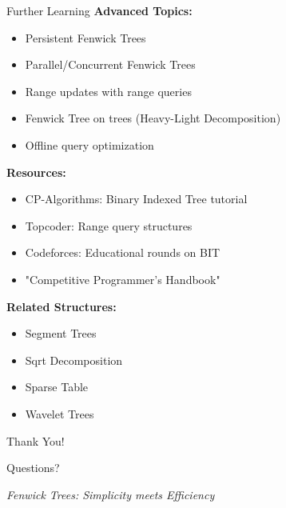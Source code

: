 \documentclass[aspectratio=169]{beamer}
\begin{document}
\begin{frame}{Further Learning}
  \textbf{Advanced Topics:}
  \begin{itemize}
    \item Persistent Fenwick Trees
    \item Parallel/Concurrent Fenwick Trees
    \item Range updates with range queries
    \item Fenwick Tree on trees (Heavy-Light Decomposition)
    \item Offline query optimization
  \end{itemize}

  \vspace{0.5cm}
  \textbf{Resources:}
  \begin{itemize}
    \item CP-Algorithms: Binary Indexed Tree tutorial
    \item Topcoder: Range query structures
    \item Codeforces: Educational rounds on BIT
    \item "Competitive Programmer's Handbook"
  \end{itemize}

  \vspace{0.5cm}
  \textbf{Related Structures:}
  \begin{itemize}
    \item Segment Trees
    \item Sqrt Decomposition
    \item Sparse Table
    \item Wavelet Trees
  \end{itemize}
\end{frame}

\begin{frame}
  \begin{center}
    {\Huge Thank You!}

    \vspace{1cm}
    {\Large Questions?}

    \vspace{1cm}
    \textit{Fenwick Trees: Simplicity meets Efficiency}
  \end{center}
\end{frame}
\end{document}
